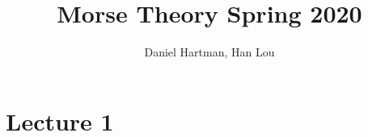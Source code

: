 \documentclass{article}
\title{Morse Theory Spring 2020}
\author{Daniel Hartman, Han Lou}
\begin{document}
\maketitle
\newpage
\tableofcontents
\newpage
\section{Lecture 1}



\end{document}
